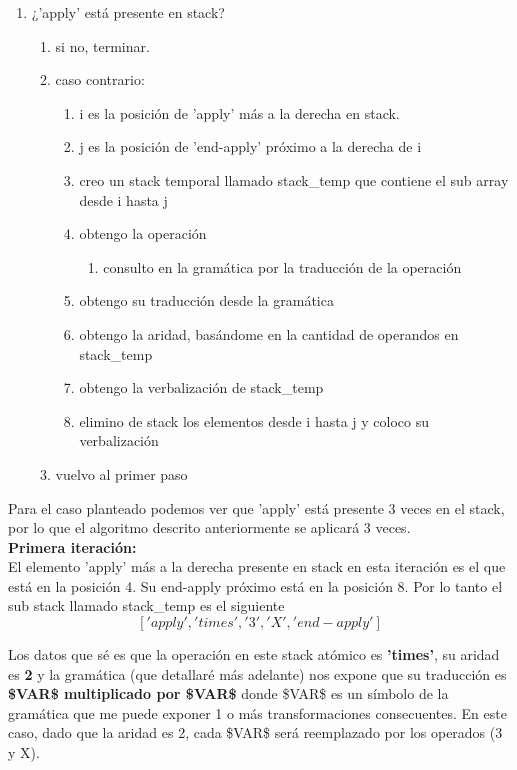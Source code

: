 \begin{enumerate}
\item ¿'apply' está presente en stack?
\begin{enumerate}
  \item si no, terminar.
  \item caso contrario:
  \begin{enumerate}
     \item i es la posición de 'apply' más a la derecha en stack.
     \item j es la posición de 'end-apply' próximo a la derecha de i
     \item creo un stack temporal llamado stack\_temp que contiene el sub array desde i hasta j
     \item obtengo la operación
     \begin{enumerate}
        \item consulto en la gramática por la traducción de la operación
     \end{enumerate}
     \item obtengo su traducción desde la gramática
     \item obtengo la aridad, basándome en la cantidad de operandos en stack\_temp
     \item obtengo la verbalización de stack\_temp
     \item elimino de stack los elementos desde i hasta j y coloco su verbalización
  \end{enumerate}
  \item vuelvo al primer paso
\end{enumerate}
\end{enumerate}

Para el caso planteado podemos ver que 'apply' está presente 3 veces en el stack, por lo que el algoritmo descrito anteriormente se aplicará 3 veces.\\

{\Large \textbf{Primera iteración:}}\\
El elemento 'apply' más a la derecha presente en stack en esta iteración es el que está en la posición 4. Su end-apply próximo está en la posición 8. Por lo tanto el sub stack llamado stack\_temp es el siguiente
$$['apply', 'times', '3', 'X', 'end-apply']$$

Los datos que sé es que la operación en este stack atómico es \textbf{'times'}, su aridad es \textbf{2} y la gramática (que detallaré más adelante) nos expone que su traducción es \textbf{\$VAR\$ multiplicado por \$VAR\$} donde \$VAR\$ es un símbolo de la gramática que me puede exponer 1 o más transformaciones consecuentes. En este caso, dado que la aridad es 2, cada \$VAR\$ será reemplazado por los operados (3 y X).

